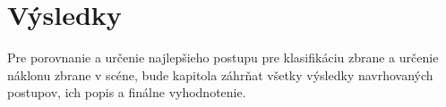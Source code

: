
\chapter{Výsledky}
Pre porovnanie a určenie najlepšieho postupu pre klasifikáciu zbrane a určenie náklonu zbrane v scéne,
    bude kapitola záhrňat všetky výsledky navrhovaných postupov, ich popis a finálne vyhodnotenie.









